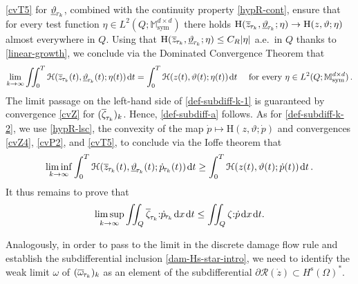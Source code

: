 \documentclass[a4paper,10pt,reqno]{amsart}
\numberwithin{equation}{section}
\newcommand{\bbM}{\mathbb{M}}
\numberwithin{equation}{section}
\def\dd{\;\!\mathrm{d}} %
\newcommand{\teta}{\vartheta}
\newcommand{\piecewiseConstant}[2]{\overline{#1}_{\kern-1pt#2}}
\newcommand{\pwc}{\piecewiseConstant}
\newcommand{\upiecewiseConstant}[2]{\underline{#1}_{\kern-1pt#2}}
\newcommand{\upwc}{\upiecewiseConstant}
\newcommand{\piecewiseLinear}[2]{{#1}_{\kern-1pt#2}}
\newcommand{\pwl}{\piecewiseLinear}
\newcommand{\mt}{\bbM}
\newcommand{\sym}{\mathrm{sym}}
\newcommand{\dip}[3]{\mathrm{H}(#1,#2;#3)}
\newcommand{\Dip}[3]{\mathcal{H}(#1,#2;#3)}
\newcommand{\Did}[1]{\mathcal{R}(#1)}
\newcommand{\subd}{\partial}
\newcommand{\spz}{H^{\mathrm{s}}(\Omega)}
\newcommand{\EEE}{\color{black}}
\begin{document}
 \eqref{cvT5} for  $\upwc\teta{\tau_k}$, combined with the  continuity property \eqref{hypR-cont},  ensure that 
 for every test function $\eta \in L^2(Q;\mt_\sym^{d\times d})$ there holds
 $\dip{\pwc z{\tau_k}}{\upwc \teta{\tau_k}}{\eta} \to \dip z\teta\eta$ almost everywhere in $Q$. Using that 
$\dip{\pwc z{\tau_k}}{\upwc \teta{\tau_k}}{\eta} \leq C_R |\eta|$ a.e.\ in $Q$ thanks to \eqref{linear-growth}, we conclude
via the Dominated Convergence Theorem that 
\begin{equation}
\label{dominated-quoted-later}
\lim_{k\to\infty} \iint_0^T  \Dip{\pwc z{\tau_k}(t)}{\upwc\teta{\tau_k}(t)}{  \eta(t)} \dd t =  
\int_0^T \Dip{z(t)}{\teta(t)}{  \eta(t)} \dd t \quad \text{ for every } \eta \in L^2(Q;\mt_\sym^{d\times d})\,.
\end{equation}
The limit passage on the left-hand side of \eqref{def-subdiff-k-1} is guaranteed by 
 convergence \eqref{cvZ} for $(\pwc\zeta{\tau_k})_k$. Hence, \eqref{def-subdiff-a} follows. 
 As for \eqref{def-subdiff-k-2}, 
   we use  \eqref{hypR-lsc}, the convexity of the map $\dot p \mapsto \dip{z}{\teta}{ \dot p}$
   and convergences \eqref{cvZ4}, 
     \eqref{cvP2}, and \eqref{cvT5},  to conclude via the Ioffe theorem \cite{Ioff77LSIF} that 
\begin{equation}\label{lscR}
\liminf_{k\to \infty} \int_0^T \Dip{\pwc z{\tau_k}(t)}{\upwc \teta{\tau_k}(t)}{ \pwl {\dot p}{\tau_k}(t)} \dd t \geq \int_0^T \Dip{z(t)}{\teta(t)}{ \dot{p}(t)} \dd t\,.
\end{equation}
It thus remains to prove that 
\begin{equation} \label{limsup-cond-p}
\limsup_{k\to \infty}  \iint_Q   \pwc\zeta{\tau_k} {:} \pwl { \dot p}{\tau_k} \dd x \dd t
 \leq  \iint_Q   \zeta {:} { \dot p} \dd x \dd t.
\end{equation}
\par
Analogously, in order to  pass to the limit in the discrete damage flow rule  and establish 
the subdifferential inclusion \eqref{dam-Hs-star-intro}, we need to identify the weak limit 
$\omega$ of $(\pwc \omega{\tau_k})_k$ as an element of  the subdifferential $\subd \Did{\dot{z}} \subset \spz^*$. 
\end{document}
